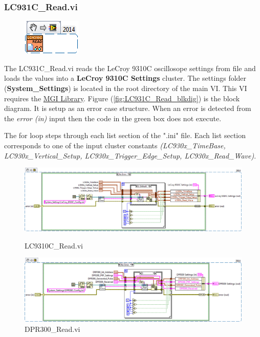 \documentclass[11pt,a4paper,oldfontcommands]{memoir}
\begin{document}
\subsubsection{LC931C\_Read.vi}

\begin{figure}[h]
	\includegraphics[scale=0.625]{LC931C_Read_main}
	\label{fig:LC931C_Read_main}
\end{figure}

The LC931C\_Read.vi reads the LeCroy 9310C oscillosope settings from file and loads the values into a \textbf{LeCroy 9310C Settings} cluster. The settings folder (\textbf{System\_Settings}) is located in the root directory of the main VI. This VI requires the \href{http://sine.ni.com/nips/cds/view/p/lang/en/nid/209753}{MGI Library}. Figure (\ref{fig:LC931C_Read_blkdig}) is the block diagram.  It is setup as an error case structure. When an error is detected from the \textit{error (in)} input then the code in the green box does not execute.

The for loop steps through each list section of the ".ini" file. Each list section corresponds to one of the input cluster constants \textit{(LC930x\_TimeBase, LC930x\_Vertical\_Setup, LC930x\_Trigger\_Edge\_Setup, LC930x\_Read\_Wave)}.

\begin{figure}
	\includegraphics[width=\textheight,keepaspectratio]{LC931C_Read_blockdiagram}
	\caption{LC9310C\_Read.vi}
	\label{fig:LC931C_Read_blkdig}
	\includegraphics[width=\textheight,keepaspectratio]{DPR300_Read_blockdiagram}
	\caption{DPR300\_Read.vi}
	\label{fig:DPR300_Read_blkdig}
\end{figure}
\end{document}
